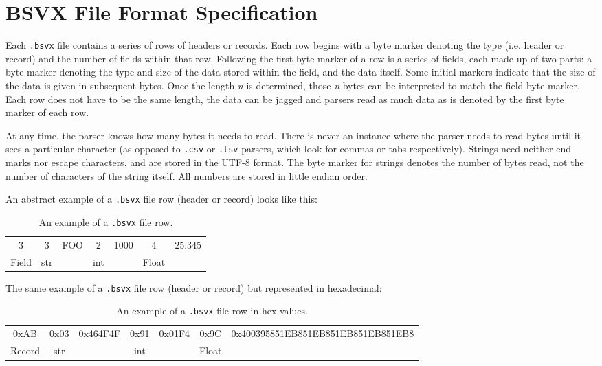 \documentclass[10pt]{article}
\begin{document}
\section*{BSVX File Format Specification}

Each \texttt{.bsvx} file contains a series of rows of headers or records.
Each row begins with a byte marker denoting the type (i.e. header or record) and the number of fields within that row.
Following the first byte marker of a row is a series of fields, each made up of two parts: a byte marker denoting the type and size of the data stored within the field, and the data itself.
Some initial markers indicate that the size of the data is given in subsequent bytes.
Once the length \textit{n} is determined, those \textit{n} bytes can be interpreted to match the field byte marker.
Each row does not have to be the same length, the data can be jagged and parsers read as much data as is denoted by the first byte marker of each row. 

\indent{}
At any time, the parser knows how many bytes it needs to read.
There is never an instance where the parser needs to read bytes until it sees a particular character (as opposed to \texttt{.csv} or \texttt{.tsv} parsers, which look for commas or tabs respectively).
Strings need neither end marks nor escape characters, and are stored in the UTF-8 format.
The byte marker for strings denotes the number of bytes read, not the number of characters of the string itself.
All numbers are stored in little endian order.

\indent{}
An abstract example of a \texttt{.bsvx} file row (header or record) looks like this:

\begin{table}[H]
\centering
\begin{tabular}{|c|c|c|c|c|c|c|}
\hline
3 & 3 & FOO & 2 & 1000 & 4 & 25.345 \\
Field & str &  & int &  & Float &  \\ \hline
\end{tabular}
\caption{An example of a \texttt{.bsvx} file row.}
\label{tab:bsvxApproach_example}
\end{table}

\indent{}
The same example of a \texttt{.bsvx} file row (header or record) but represented in hexadecimal:

\begin{table}[H]
\centering
\begin{tabular}{|c|c|c|c|c|c|c|}
\hline
0xAB & 0x03 & 0x464F4F & 0x91 & 0x01F4 & 0x9C & 0x400395851EB851EB851EB851EB851EB8 \\
Record & str &  & int &  & Float &  \\ \hline
\end{tabular}
\caption{An example of a \texttt{.bsvx} file row in hex values.}
\label{tab:bsvxApproach_example in hexadecimal}
\end{table}
\end{document}
